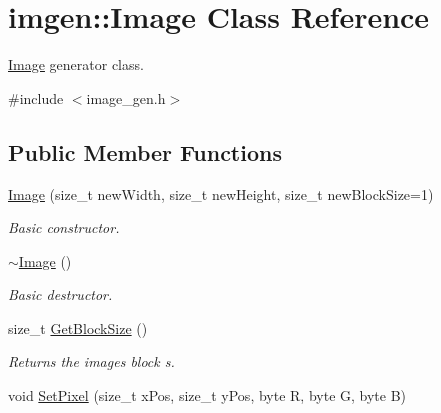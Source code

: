 \hypertarget{classimgen_1_1Image}{}\section{imgen\+:\+:Image Class Reference}
\label{classimgen_1_1Image}


\hyperlink{classimgen_1_1Image}{Image} generator class.  




{\ttfamily \#include $<$image\+\_\+gen.\+h$>$}

\subsection*{Public Member Functions}
\begin{DoxyCompactItemize}
\item 
\mbox{\label{classimgen_1_1Image_a2b0df4a76f784a021e06878ac8dab896}} 
\hyperlink{classimgen_1_1Image_a2b0df4a76f784a021e06878ac8dab896}{Image} (size\+\_\+t new\+Width, size\+\_\+t new\+Height, size\+\_\+t new\+Block\+Size=1)
\begin{DoxyCompactList}\small\item\em Basic constructor. \end{DoxyCompactList}\item 
\mbox{\label{classimgen_1_1Image_a13a5785f551783b34c5be86b63d1e3c5}} 
\hyperlink{classimgen_1_1Image_a13a5785f551783b34c5be86b63d1e3c5}{$\sim$\+Image} ()
\begin{DoxyCompactList}\small\item\em Basic destructor. \end{DoxyCompactList}\item 
\mbox{\label{classimgen_1_1Image_aff2f85c54d9d755e1b7ab32deb4d2b8d}} 
size\+\_\+t \hyperlink{classimgen_1_1Image_aff2f85c54d9d755e1b7ab32deb4d2b8d}{Get\+Block\+Size} ()
\begin{DoxyCompactList}\small\item\em Returns the image\textquotesingle{}s block s. \end{DoxyCompactList}\item 
\mbox{\label{classimgen_1_1Image_adb82c352d197513b9da66baac6e68663}} 
void \hyperlink{classimgen_1_1Image_adb82c352d197513b9da66baac6e68663}{Set\+Pixel} (size\+\_\+t x\+Pos, size\+\_\+t y\+Pos, byte R, byte G, byte B)

\end{DoxyCompactItemize}
